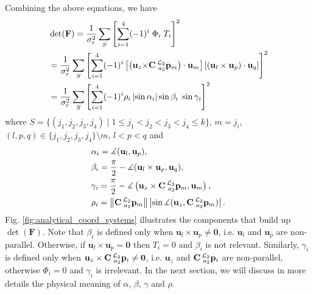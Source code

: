 \documentclass[journal]{IEEEtran}
\newcommand{\norm}[1]{\left\lVert#1\right\rVert}
\def\AlignedPosTarg{\mathbf{C} \prescript{\mathcal{L}_2}{a_2}{\mathbf{p}}} %
\def\FIM{\mathbf{F}}
\def\detF{\det(\FIM)}
\def\UnitZ{\mathbf{u}_z}
\begin{document}
Combining the above equations,%
we have
\begin{equation}\label{eq:det_FIM_RTE}
\begin{aligned}
    &\detF 
    = \frac{1}{\sigma_r^2} \sum\limits_{S}^{} 
    \left[
        \sum\limits_{i=1}^{4}
        (-1)^{i} \; \Phi_i \; T_i
    \right]^2 \\
    &= \frac{1}{\sigma_r^2} \sum\limits_{S}^{} 
    \left[
        \sum\limits_{i=1}^{4}
        (-1)^{i}
        \left[
            \left( \UnitZ {\times} \AlignedPosTarg_m \right)
            \cdot 
            \mathbf{u}_m
        \right]
        \left[
            (\mathbf{u}_l \times \mathbf{u}_p) 
            \cdot 
            \mathbf{u}_q
        \right]%
    \right]^2\\
    &= \frac{1}{\sigma_r^2} \sum\limits_{S}^{} 
    \left[
        \sum\limits_{i=1}^{4} (-1)^{i}
        \rho_i
        \left| \sin{\alpha_i} \right|
        \sin{\beta_i} \;
        \sin{\gamma_i}
    \right]^2
\end{aligned}
\end{equation}
where $S = \{ (j_1,j_2,j_3,j_4) \; \vert \; 1 \leq j_1 < j_2 < j_3 < j_4 \leq k \}$, ${m = j_i}$, ${(l,p,q) \in \{j_1,j_2,j_3,j_4\} \setminus m}$, ${l < p < q}$ and
\begin{equation} \label{eq:det_FIM_components}
\begin{aligned}
    &\alpha_i = 
    \measuredangle (\mathbf{u}_l, \mathbf{u}_p), \\
    &\beta_i = 
    \frac{\pi}{2} - \measuredangle (\mathbf{u}_l \times \mathbf{u}_p, \mathbf{u}_q), \\
    &\gamma_i = 
    \frac{\pi}{2} - \measuredangle 
    \left(
    \UnitZ \times \AlignedPosTarg_m, \mathbf{u}_m
    \right), \\
    &\rho_i =
    \norm{\AlignedPosTarg_m}
    \left| 
        \sin \measuredangle (\UnitZ, \AlignedPosTarg_m)
    \right|.
\end{aligned}
\end{equation}
Fig. \ref{fig:analytical_coord_systems} illustrates the components that build up $\detF$.
Note that $\beta_i$ is defined only when $\mathbf{u}_l \times \mathbf{u}_p \neq \mathbf{0}$, i.e. $\mathbf{u}_l$ and $\mathbf{u}_p$ are non-parallel. Otherwise, if $\mathbf{u}_l \times \mathbf{u}_p = \mathbf{0}$ then $T_i = 0$ and $\beta_i$ is not relevant.
Similarly, $\gamma_i$ is defined only when $\UnitZ \times \AlignedPosTarg_i \neq \mathbf{0}$, i.e. $\UnitZ$ and $\AlignedPosTarg_i$ are non-parallel, otherwise $\Phi_i = 0$ and $\gamma_i$ is irrelevant.
In the next section, we will discuss in more details the physical meaning of $\alpha$, $\beta$, $\gamma$ and $\rho$.
\end{document}
